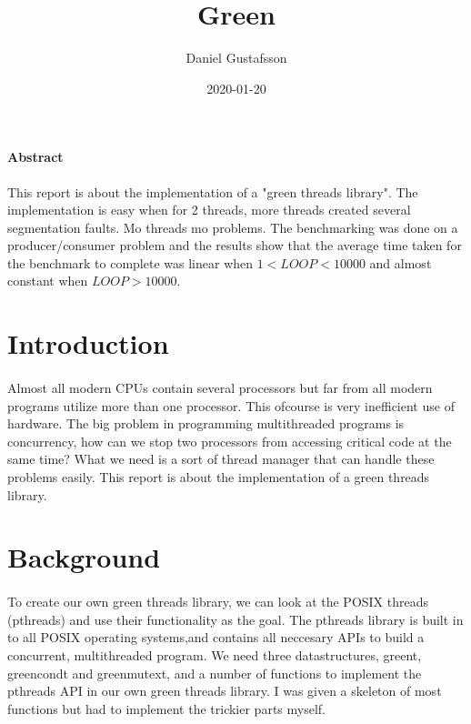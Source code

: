 \documentclass[11pt]{article}
\title{Green}
\date{2020-01-20}
\author{Daniel Gustafsson}
\begin{document}
\maketitle
{}

\newpage
{}

\paragraph{Abstract}
This report is about the implementation of a "green threads library". The implementation is easy when for 2 threads, more threads created several
segmentation faults. Mo threads mo problems. The benchmarking was done on a producer/consumer problem and the results show that the average time taken
for the benchmark to complete was linear when $1<LOOP<10000$ and almost constant when $LOOP>10000$. 

\section{Introduction}

\paragraph{}
Almost all modern CPUs contain several processors but far from all modern programs utilize more than one processor. This ofcourse is very inefficient 
use of hardware. The big problem in programming multithreaded programs is concurrency, how can we stop two processors from accessing critical code
at the same time? What we need is a sort of thread manager that can handle these problems easily. This report is about
the implementation of a green threads library.

\section{Background}

\paragraph{}
To create our own green threads library, we can look at the POSIX threads (pthreads) and use their functionality as the goal.
The pthreads library is built in to all POSIX operating systems,and contains all neccesary APIs to build a concurrent, 
multithreaded program. We need three datastructures, green\textunderscore t, green\textunderscore cond\textunderscore t and
green\textunderscore mutex\textunderscore t, and a number of functions to implement the pthreads API in our own green threads library.
I was given a skeleton of most functions but had to implement the trickier parts myself.
\end{document}
